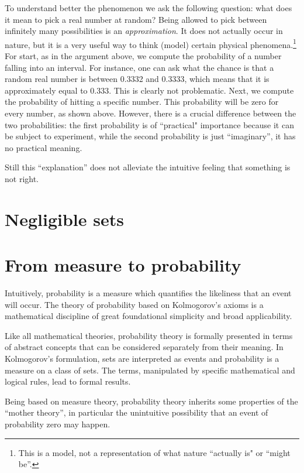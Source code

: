 \documentclass[11pt]{article}
\begin{document}
 To understand better the phenomenon  we  ask the following question: what does it mean to pick a real number at random?
Being allowed to pick between infinitely many possibilities is an {\em approximation}. It does not actually occur in nature, but it is a very useful  way to think (model) certain physical phenomena.\footnote{This is a model, not a representation of what nature ``actually is" or ``might be''.}
For start,  as in the argument above, we compute the probability of a number falling into an interval. For instance, one can ask what the chance is that a random real number is between 0.3332 and 0.3333, which means that it is approximately equal to 0.333.  This is clearly not  problematic. Next, we compute
 the probability of hitting a specific number. This probability will be zero for every number,  as shown above. However, there is a crucial difference between the two probabilities:  the first probability is of  ``practical" importance because it can be subject to experiment, while the second probability is just ``imaginary'', it has no practical meaning.

 Still this ``explanation'' does not alleviate the intuitive feeling that something is not right.






\section{Negligible sets}

\section{From measure to probability}
Intuitively, probability is a measure which quantifies the likeliness that an event will occur.
The  theory of  probability based on Kolmogorov's axioms \cite{kolmogorov2,kolmogorov2e}
is a mathematical discipline of great foundational simplicity and broad applicability.

Like all mathematical theories,  probability theory is formally presented in terms of abstract  concepts  that can be considered separately from their meaning.
     In Kolmogorov's formulation, sets are interpreted as events and probability is a measure on a class of sets.
The terms, manipulated by  specific mathematical and logical  rules,
lead to formal results.

Being based on measure theory, probability theory inherits some properties of the ``mother theory'', in particular  the unintuitive  possibility that an event of probability zero may happen.
\end{document}
